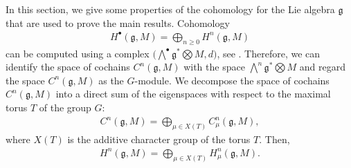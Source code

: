 \documentclass[10pt,a4paper]{amsart}
\numberwithin{equation}{section}
\begin{document}
In this section, we give some properties of the cohomology for the Lie algebra $\mathfrak{g}$ that are used to prove the main results.
Cohomology
\begin{gather*}
H^{\bullet}({\mathfrak{g}},M)=\bigoplus_{n\geq0}H^n({\mathfrak{g}},M)
\end{gather*}
can be computed using a complex $\big(\bigwedge^{\bullet}{\mathfrak{g}}^*\bigotimes M,d\big)$, see \cite[Section~I.9.17]{Jan03}. Therefore, we can identify the space of cochains $C^n({\mathfrak{g}},M)$ with the space $\bigwedge^n{\mathfrak{g}}^*\bigotimes M$ and regard the space $C^n({\mathfrak{g}},M)$ as the $G$-module. We decompose the space of cochains $C^{n}(\mathfrak{g},M)$ into a direct sum
of the eigenspaces with respect to the maximal torus $T$ of the group $G$:
\begin{gather*}
C^{n}({\mathfrak{g}},M)=\bigoplus_{\mu\in
X(T)}C^{n}_{\mu}(\mathfrak{g},M),
\end{gather*}
where $X(T)$ is the additive character group of the torus $T$.
Then,
\begin{gather*}
H^n({\mathfrak{g}},M)=\bigoplus_{\mu\in
X(T)}H^n_{\mu}({\mathfrak{g}},M).
\end{gather*}
\end{document}
